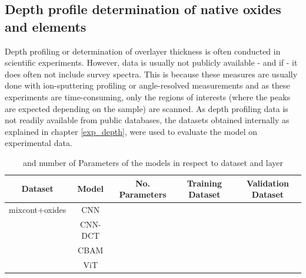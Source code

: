 \subsection{Depth profile determination of native oxides and elements}

Depth profiling or determination of overlayer thickness is often conducted in scientific experiments. However, data is usually not publicly available - and if - it does often not include survey spectra. This is because these measures are usually done with ion-sputtering profiling or angle-resolved measurements and as these experiments are time-consuming, only the regions of interests (where the peaks are expected depending on the sample) are scanned.
As depth profiling data is not readily available from public databases, the datasets obtained internally as explained in chapter \ref{exp_depth}, were used to evaluate the model on experimental data.

\begin{table}[H]
    \centering
    \begin{tabular}{c|c|c|c|c}
        Dataset & Model   & No. Parameters & Training Dataset    & Validation Dataset    \\
        \hline
 mixcont+oxides& CNN     &                &                       &                         \\
               & CNN-DCT &                &                       &                         \\
               & CBAM    &                &                       &                         \\
               & ViT     &                &                       &                         \\

    \end{tabular}
    \caption{ and number of Parameters of the models in respect to dataset and layer}
    \label{tab:acc_depth}
\end{table}


